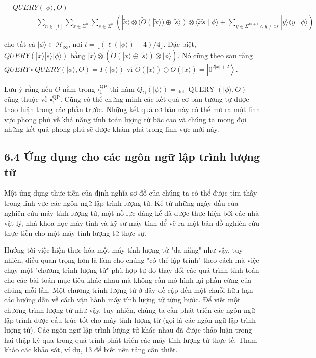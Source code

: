 \documentclass[10pt]{article}
\begin{document}
$$
\begin{aligned}
& Q U E R Y(|\phi\rangle, O) \\
& \qquad=\sum_{n \in[t]} \sum_{x \in \Sigma^{n}} \sum_{s \in \Sigma^{n}}\left(|\tilde{x}\rangle \otimes(\tilde{O}(|\tilde{x}\rangle) \oplus|\tilde{s}\rangle) \otimes\langle\tilde{x} \tilde{s} \mid \phi\rangle+\sum_{y \in \Sigma^{4 n+4} \wedge y \neq \tilde{x} \tilde{s}}|y\rangle\langle y \mid \phi\rangle\right)
\end{aligned}
$$

cho tất cả $|\phi\rangle \in \mathcal{H}_{\infty}$, nơi $t=\lfloor(\ell(|\phi\rangle)-4) / 4\rfloor$. Đặc biệt, $Q U E R Y(|\tilde{x}\rangle|\tilde{s}\rangle|\phi\rangle)$ bằng $|\tilde{x}\rangle \otimes(\tilde{O}(|\tilde{x}\rangle \oplus|\tilde{s}\rangle) \otimes|\phi\rangle)$. Nó cũng theo sau rằng $Q U E R Y \circ Q U E R Y(|\phi\rangle, O)=I(|\phi\rangle)$ vì $\tilde{O}(|\tilde{x}\rangle) \oplus \tilde{O}(|\tilde{x}\rangle)=\left|0^{2|x|+2}\right\rangle$.

Lưu ý rằng nếu $O$ nằm trong $\square_{1}^{\mathrm{QP}}$ thì hàm $Q_{O}(|\phi\rangle)={ }_{\text {def }} \operatorname{QUERY}(|\phi\rangle, O)$ cũng thuộc về $\square_{1}^{\mathrm{QP}}$. Cũng có thể chứng minh các kết quả cơ bản tương tự được thảo luận trong các phần trước. Những kết quả cơ bản này có thể mở ra một lĩnh vực phong phú về khả năng tính toán lượng tử bậc cao và chúng ta mong đợi những kết quả phong phú sẽ được khám phá trong lĩnh vực mới này.

\subsection*{6.4 Ứng dụng cho các ngôn ngữ lập trình lượng tử}
Một ứng dụng thực tiễn của định nghĩa sơ đồ của chúng ta có thể được tìm thấy trong lĩnh vực các ngôn ngữ lập trình lượng tử. Kể từ những ngày đầu của nghiên cứu máy tính lượng tử, một nỗ lực đáng kể đã được thực hiện bởi các nhà vật lý, nhà khoa học máy tính và kỹ sư máy tính để vẽ ra một bản đồ nghiên cứu thực tiễn cho một máy tính lượng tử thực sự.

Hướng tới việc hiện thực hóa một máy tính lượng tử "đa năng" như vậy, tuy nhiên, điều quan trọng hơn là làm cho chúng "có thể lập trình" theo cách mà việc chạy một "chương trình lượng tử" phù hợp tự do thay đổi các quá trình tính toán cho các bài toán mục tiêu khác nhau mà không cần mô hình lại phần cứng của chúng mỗi lần. Một chương trình lượng tử ở đây đề cập đến một chuỗi hữu hạn các hướng dẫn về cách vận hành máy tính lượng tử từng bước. Để viết một chương trình lượng tử như vậy, tuy nhiên, chúng ta cần phát triển các ngôn ngữ lập trình được cấu trúc tốt cho máy tính lượng tử (gọi là các ngôn ngữ lập trình lượng tử). Các ngôn ngữ lập trình lượng tử khác nhau đã được thảo luận trong hai thập kỷ qua trong quá trình phát triển các máy tính lượng tử thực tế. Tham khảo các khảo sát, ví dụ, 13 để biết nền tảng cần thiết.
\end{document}
